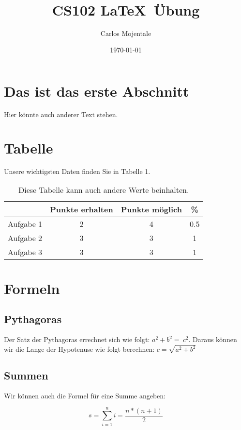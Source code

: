 \documentclass[10pt]{article}
\title{CS102 \LaTeX ~\"Ubung}
\author{Carlos Mojentale}
\date{\today}
\begin{document}
\maketitle

\section{Das ist das erste Abschnitt}

Hier k\"onnte auch anderer Text stehen.

\section{Tabelle}

Unsere wichtigsten Daten finden Sie in Tabelle 1.

\begin{table}[!th]

\centering

\begin{tabular}{c|c|c|c}

& Punkte erhalten & Punkte m\"oglich & \% \\

\hline

Aufgabe 1 & 2 & 4 & 0.5 \\

Aufgabe 2 & 3 & 3 & 1 \\

Aufgabe 3 & 3 & 3 & 1 \\

\end{tabular}

\caption{Diese Tabelle kann auch andere Werte beinhalten.}

\label{table:diese Tabelle kann auch andere Werte beinhalten.}

\end{table}

\section{Formeln}

\subsection{Pythagoras}

Der Satz der Pythagoras errechnet sich wie folgt: $a^{2} + b^{2} =\ c^{2}$. Daraus k\"onnen 
\\wir die Lange der Hypotenuse wie folgt berechnen: $c =\sqrt{a^{2} + b^{2}}$ 

\subsection{Summen}

Wir k\"onnen auch die Formel f\"ur eine Summe angeben:

\begin{equation}
s = \sum_{i=1}^n i = \frac{n*(n+1)}{2}
\end{equation}
\end{document}
